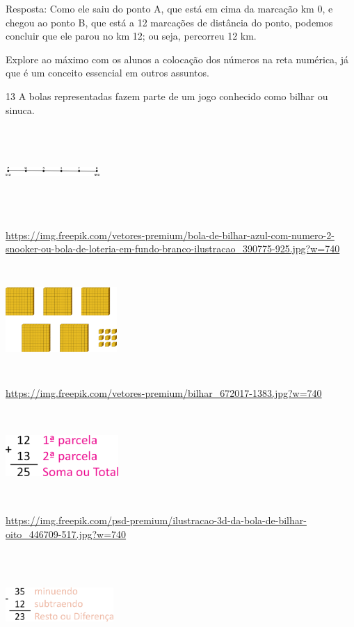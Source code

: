 Resposta:
Como ele saiu do ponto A, que está em cima da marcação km 0, e chegou ao
ponto B, que está a 12 marcações de distância do ponto, podemos concluir
que ele parou no km 12; ou seja, percorreu 12 km.

Explore ao máximo com os alunos a colocação dos números na reta numérica,
já que é um conceito essencial em outros assuntos.

\num{13} A bolas representadas fazem parte de um jogo conhecido como
bilhar ou sinuca.

\includegraphics[width=1.40833in,height=1.33406in]{media/image8.png}

\url{https://img.freepik.com/vetores-premium/bola-de-bilhar-azul-com-numero-2-snooker-ou-bola-de-loteria-em-fundo-branco-ilustracao_390775-925.jpg?w=740}

\includegraphics[width=1.66667in,height=1.61877in]{media/image9.png}

\url{https://img.freepik.com/vetores-premium/bilhar_672017-1383.jpg?w=740}

\includegraphics[width=1.68333in,height=1.36449in]{media/image10.png}

\url{https://img.freepik.com/psd-premium/ilustracao-3d-da-bola-de-bilhar-oito_446709-517.jpg?w=740}

\includegraphics[width=1.61667in,height=1.60236in]{media/image11.png}

